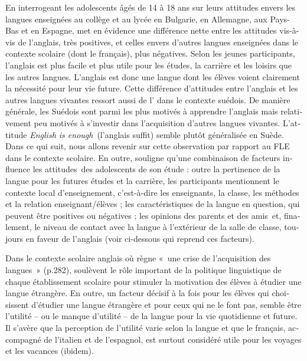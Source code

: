 \documentclass[french, output=paper]{langscibook}
\begin{document}
\begin{otherlanguage}{french}
En interrogeant les adolescents âgés de 14 à 18 ans sur leurs attitudes envers les langues enseignées au collège et au lycée en Bulgarie, en Allemagne, aux Pays-Bas et en Espagne, \citet{Busse2017} met en évidence une différence nette entre les attitudes vis-à-vis de l’anglais, très positives, et celles envers d’autres langues enseignées dans le contexte scolaire (dont le français), plus négatives. Selon les jeunes participants, l’anglais est plus facile et plus utile pour les études, la carrière et les loisirs que les autres langues. L’anglais est donc une langue dont les élèves voient clairement la nécessité pour leur vie future. Cette différence d’attitudes entre l’anglais et les autres langues vivantes ressort aussi de l’\citet{Eurobaromètre2012} dans le contexte suédois. De manière générale, les Suédois sont parmi les plus motivés à apprendre l’anglais mais relativement peu motivés à s’investir dans l’acquisition d’autres langues vivantes. L’attitude \textit{English is enough}~(l’anglais suffit) semble plutôt généralisée en Suède. Dans ce qui suit, nous allons revenir sur cette observation par rapport au FLE dans le contexte scolaire. En outre, \citet{Busse2017} souligne qu’une combinaison de facteurs influence les attitudes~des adolescents de son étude : outre la pertinence de la langue pour les futures études et la carrière, les participants mentionnent le contexte local d’enseignement, c’est-à-dire les enseignants, la classe, les méthodes et la relation enseignant/élèves ; les caractéristiques de la langue en question, qui peuvent être positives ou négatives ; les opinions des parents et des amis~et, finalement, le niveau de contact avec la langue à l’extérieur de la salle de classe, toujours en faveur de l’anglais (voir  ci-dessous qui reprend ces facteurs). 

Dans le contexte scolaire anglais où règne «~une crise de l’acquisition des langues~» (p.282), \citet{ParrishLanvers2019} soulèvent le rôle important de la politique linguistique de chaque établissement scolaire pour stimuler la motivation des élèves à étudier une langue étrangère. En outre, un facteur décisif à la fois pour les élèves qui choisissent d’étudier une langue étrangère et pour ceux qui ne le font pas, semble être l’utilité -- ou le manque d’utilité -- de la langue pour la vie quotidienne et future. Il s’avère que la perception de l’utilité varie selon la langue et que le français, accompagné de l’italien et de l’espagnol, est surtout considéré utile pour les voyages et les vacances (ibidem). 


\end{otherlanguage}
\end{document}
